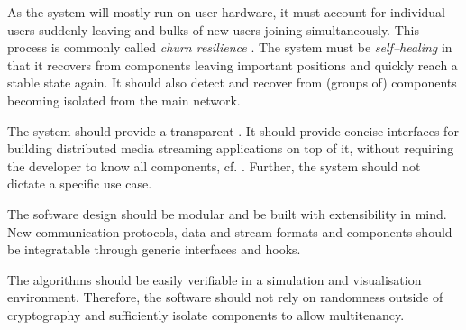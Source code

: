 \begin{enumerate}
As the system will mostly run on user hardware, it must account for individual users suddenly leaving and bulks of new users joining simultaneously. This process is commonly called \textit{churn resilience} \cite{churn-resilience, stutzbach_rejaie_2006}. The system must be \textit{self–healing} in that it recovers from components leaving important positions and quickly reach a stable state again. It should also detect and recover from (groups of) components becoming isolated from the main network.

The system should provide a transparent . It should provide concise interfaces for building distributed media streaming applications on top of it, without requiring the developer to know all components, cf. \citet[pp. 23-25]{distributed-systems-concepts-design}. Further, the system should not dictate a specific use case.

The software design should be modular and be built with extensibility in mind. New communication protocols, data and stream formats and components should be integratable through generic interfaces and hooks.

The algorithms should be easily verifiable in a simulation and visualisation environment. Therefore, the software should not rely on randomness outside of cryptography and sufficiently isolate components to allow multitenancy.

\end{enumerate}
